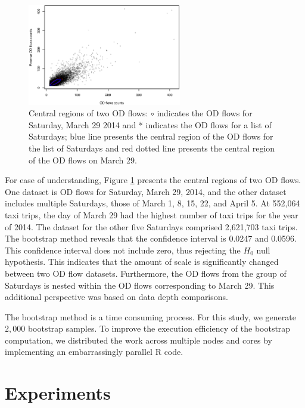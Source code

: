 \documentclass[a4paper,UKenglish]{lipics-v2018}
\begin{document}
\begin{figure}
	\centering
	\includegraphics[width=0.6\textwidth]{images/com_mar_0329.eps}
	\caption{Central regions of two OD flows: $\circ$ indicates the OD flows for Saturday, March 29 2014 and * indicates the OD flows for a list of Saturdays; blue line presents the central region of the OD flows for the list of Saturdays and red dotted line presents the central region of the OD flows on March 29.}
	\label{fig:com_mar_0329}	
\end{figure}

For ease of understanding, Figure \ref{fig:com_mar_0329} presents the central regions of two OD flows.
One dataset is OD flows for Saturday, March 29, 2014, and the other dataset includes multiple Saturdays, those of March 1, 8, 15, 22, and April 5. At 552,064 taxi trips, the day of March 29 had the highest number of taxi trips for the year of 2014.
The dataset for the other five Saturdays comprised 2,621,703 taxi trips.
The bootstrap method reveals that the confidence interval is 0.0247 and 0.0596.
This confidence interval does not include zero, thus rejecting the $H_0$ null hypothesis.
This indicates that the amount of scale is significantly changed between two OD flow datasets.
Furthermore, the OD flows from the group of Saturdays is nested within the OD flows corresponding to March 29. This additional perspective was based on data depth comparisons. 

The bootstrap method is a time consuming process.
For this study, we generate $2,000$ bootstrap samples.
To improve the execution efficiency of the bootstrap computation, we distributed the work across multiple nodes and cores by implementing an embarrassingly parallel R code. 



\section{Experiments}
\label{sec:experiments}
\end{document}
